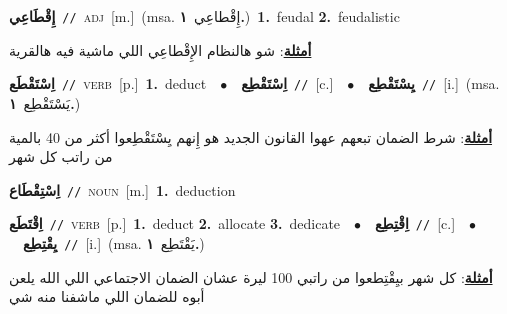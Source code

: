 \documentclass[10pt,a4paper,twoside]{article} %
\begin{document}
\begin{multicols}{2}
{\setlength\topsep{0pt}\textbf{\foreignlanguage{arabic}{إِقْطَاعِي}}\ {\color{gray}\texttt{//}\color{black}}\ \textsc{adj}\ [m.]\ \color{gray}(msa. \foreignlanguage{arabic}{إِقْطاعِي}~\foreignlanguage{arabic}{\textbf{١.}})\color{black}\ \textbf{1.}~feudal  \textbf{2.}~feudalistic\  \begin{flushright}\color{gray}\foreignlanguage{arabic}{\textbf{\underline{\foreignlanguage{arabic}{أمثلة}}}: شو هالنظام الإِقْطاعِي اللي ماشية فيه هالقرية}\end{flushright}\color{black}} \vspace{2mm}

{\setlength\topsep{0pt}\textbf{\foreignlanguage{arabic}{اِسْتَقْطَع}}\ {\color{gray}\texttt{//}\color{black}}\ \textsc{verb}\ [p.]\ \textbf{1.}~deduct\ \ $\bullet$\ \ \setlength\topsep{0pt}\textbf{\foreignlanguage{arabic}{اِسْتَقْطِع}}\ {\color{gray}\texttt{//}\color{black}}\ [c.]\ \ $\bullet$\ \ \setlength\topsep{0pt}\textbf{\foreignlanguage{arabic}{يِسْتَقْطِع}}\ {\color{gray}\texttt{//}\color{black}}\ [i.]\ \color{gray}(msa. \foreignlanguage{arabic}{يَسْتَقْطِع}~\foreignlanguage{arabic}{\textbf{١.}})\color{black}\  \begin{flushright}\color{gray}\foreignlanguage{arabic}{\textbf{\underline{\foreignlanguage{arabic}{أمثلة}}}: شرط الضمان تبعهم عهوا القانون الجديد هو إِنهم يِسْتَقْطِعوا أكثر من 40 بالمية من راتب كل شهر}\end{flushright}\color{black}} \vspace{2mm}

{\setlength\topsep{0pt}\textbf{\foreignlanguage{arabic}{اِسْتِقْطَاع}}\ {\color{gray}\texttt{//}\color{black}}\ \textsc{noun}\ [m.]\ \textbf{1.}~deduction\ } \vspace{2mm}

{\setlength\topsep{0pt}\textbf{\foreignlanguage{arabic}{اِقْتَطَع}}\ {\color{gray}\texttt{//}\color{black}}\ \textsc{verb}\ [p.]\ \textbf{1.}~deduct  \textbf{2.}~allocate  \textbf{3.}~dedicate\ \ $\bullet$\ \ \setlength\topsep{0pt}\textbf{\foreignlanguage{arabic}{اِقْتِطِع}}\ {\color{gray}\texttt{//}\color{black}}\ [c.]\ \ $\bullet$\ \ \setlength\topsep{0pt}\textbf{\foreignlanguage{arabic}{يِقْتِطِع}}\ {\color{gray}\texttt{//}\color{black}}\ [i.]\ \color{gray}(msa. \foreignlanguage{arabic}{يَقْتَطِع}~\foreignlanguage{arabic}{\textbf{١.}})\color{black}\  \begin{flushright}\color{gray}\foreignlanguage{arabic}{\textbf{\underline{\foreignlanguage{arabic}{أمثلة}}}: كل شهر بيِقْتِطعوا من راتبي 100 ليرة عشان الضمان الاجتماعي اللي الله يلعن أبوه للضمان اللي ماشفنا منه شي}\end{flushright}\color{black}} \vspace{2mm}


\end{multicols}
\end{document}
